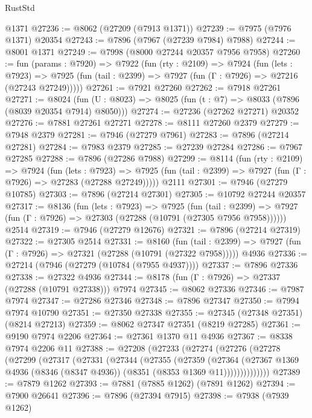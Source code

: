 \begin{lexlean}{RustStd}
\begin{coremodule}
    @1371
@27236 := @8062 (@27209 (@7913 @1371))
@27239 := @7975 (@7976 @1371) @20354
@27243 := @7896 (@7967 (@27239 @7984) @7988)
@27244 := @8001 @1371
@27249 := @7998 (@8000 @27244 @20357 @7956 @7958)
@27260 := fun (params : @7920) =>
  @7922
    (fun (rty : @2109) =>
    @7924
      (fun (lets : @7923) =>
      @7925 (fun (tail : @2399) => @7927 (fun (Γ : @7926) => @27216 (@27243 @27249)))))
@27261 := @7921 @27260
@27262 := @7918 @27261
@27271 := @8024
    (fun (U : @8023) => @8025 (fun (t : @7) => @8033 (@7896 (@8039 @20354 @7914) @8050)))
@27274 := @27236 (@27262 @27271) @20352
@27276 := @7881 @27261 @27271
@27278 := @8111 @27260 @2379
@27279 := @7948 @2379
@27281 := @7946 (@27279 @7961)
@27283 := @7896 (@27214 @27281)
@27284 := @7983 @2379
@27285 := @27239 @27284
@27286 := @7967 @27285
@27288 := @7896 (@27286 @7988)
@27299 := @8114
    (fun (rty : @2109) =>
    @7924
      (fun (lets : @7923) =>
      @7925 (fun (tail : @2399) => @7927 (fun (Γ : @7926) => @27283 (@27288 @27249)))))
    @2111
@27301 := @7946 (@27279 @10785)
@27303 := @7896 (@27214 @27301)
@27305 := @10792 @27244 @20357
@27317 := @8136
    (fun (lets : @7923) =>
    @7925
      (fun (tail : @2399) =>
      @7927 (fun (Γ : @7926) => @27303 (@27288 (@10791 (@27305 @7956 @7958))))))
    @2514
@27319 := @7946 (@27279 @12676)
@27321 := @7896 (@27214 @27319)
@27322 := @27305 @2514
@27331 := @8160
    (fun (tail : @2399) => @7927 (fun (Γ : @7926) => @27321 (@27288 (@10791 (@27322 @7958)))))
    @4936
@27336 := @27214 (@7946 (@27279 (@10784 (@7955 @4937))))
@27337 := @7896 @27336
@27338 := @27322 @4936
@27344 := @8178 (fun (Γ : @7926) => @27337 (@27288 (@10791 @27338))) @7974
@27345 := @8062 @27336
@27346 := @7987 @7974
@27347 := @27286 @27346
@27348 := @7896 @27347
@27350 := @7994 @7974 @10790
@27351 := @27350 @27338
@27355 := @27345 (@27348 @27351) (@8214 @27213)
@27359 := @8062 @27347 @27351 (@8219 @27285)
@27361 := @9190 @7974 @2206
@27364 := @27361 @1370 @11 @4936
@27367 := @8338 @7974 @2206 @11
@27388 := @27208
    (@27233
      (@27274
        (@27276
          (@27278
            (@27299
              (@27317
                (@27331
                  (@27344
                    (@27355
                      (@27359
                        (@27364
                          (@27367
                            @1369
                            @4936
                            (@8346 (@8347 @4936))
                            (@8351 (@8353 @1369 @11))))))))))))))
@27389 := @7879 @1262
@27393 := @7881 (@7885 @1262) (@7891 @1262)
@27394 := @7900 @26641
@27396 := @7896 (@27394 @7915)
@27398 := @7938 (@7939 @1262)

\end{coremodule}
\end{lexlean}
